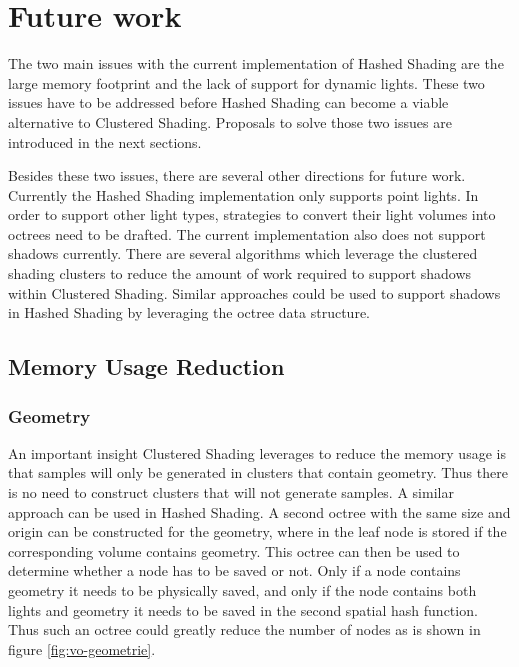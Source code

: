 \section{Future work}

The two main issues with the current implementation of Hashed Shading are the large memory
footprint and the lack of support for dynamic lights. These two issues have to be addressed
before Hashed Shading can become a viable alternative to Clustered Shading. Proposals
to solve those two issues are introduced in the next sections.

Besides these two issues, there are several other directions for future work. Currently
the Hashed Shading implementation only supports point lights. In order to support
other light types, strategies to convert their light volumes into octrees need to be
drafted. The current implementation also does not support shadows currently. There
are several algorithms which leverage the clustered shading clusters to reduce
the amount of work required to support shadows within Clustered Shading\cite{Olsson:2014:EVS:2556700.2556701, kampe2016fast}.
Similar approaches could be used to support shadows in Hashed Shading by leveraging
the octree data structure.


\subsection{Memory Usage Reduction}
\subsubsection{Geometry}



An important insight Clustered Shading leverages to reduce the memory usage is that samples
will only be generated in clusters that contain geometry. Thus there is no need to construct
clusters that will not generate samples. A similar approach can be used in Hashed Shading.
A second octree with the same size and origin can be constructed for the geometry, where in
the leaf node is stored if the corresponding volume contains geometry. This octree can then
be used to determine whether a node has to be saved or not. Only if a node contains geometry
it needs to be physically saved, and only if the node contains both lights and geometry it
needs to be saved in the second spatial hash function. Thus such an octree could greatly
reduce the number of nodes as is shown in figure \ref{fig:vo-geometrie}.

